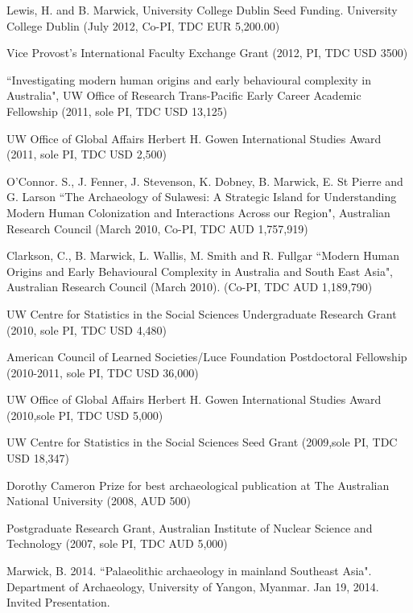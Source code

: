 \documentclass[11pt,article,oneside]{memoir}
\begin{document}
\ind Lewis, H. and B. Marwick,  University College Dublin Seed Funding. University College Dublin (July 2012, Co-PI, TDC EUR 5,200.00) 

\ind Vice Provost’s International Faculty Exchange Grant (2012, PI, TDC USD 3500)

\ind  ``Investigating modern human origins and early behavioural complexity in Australia", UW Office of Research Trans-Pacific Early Career Academic Fellowship (2011, sole PI, TDC USD 13,125)

\ind UW Office of Global Affairs Herbert H. Gowen International Studies Award (2011, sole PI, TDC USD 2,500)

\ind O’Connor. S., J. Fenner, J. Stevenson, K. Dobney, B. Marwick, E. St Pierre and G. Larson ``The Archaeology of Sulawesi: A Strategic Island for Understanding Modern Human Colonization and Interactions Across our Region", Australian Research Council (March 2010, Co-PI, TDC AUD 1,757,919)

\ind Clarkson, C., B. Marwick, L. Wallis, M. Smith and R. Fullgar  ``Modern Human Origins and Early Behavioural Complexity in Australia and South East Asia", Australian Research Council (March 2010). (Co-PI, TDC AUD 1,189,790)

\ind UW Centre for Statistics in the Social Sciences Undergraduate Research Grant (2010, sole PI, TDC USD 4,480)

\ind American Council  of Learned Societies/Luce Foundation Postdoctoral Fellowship (2010-2011, sole PI, TDC USD 36,000)

\ind UW Office of Global Affairs Herbert H. Gowen International Studies Award (2010,sole  PI, TDC USD 5,000)

\ind UW Centre for Statistics in the Social Sciences Seed Grant (2009,sole PI, TDC USD 18,347)

\ind Dorothy Cameron Prize for best archaeological publication at The Australian National University (2008, AUD 500)

\ind Postgraduate Research Grant, Australian Institute of Nuclear Science and Technology (2007, sole PI, TDC AUD 5,000)

\bigskip



\medskip

\ind Marwick, B. 2014. ``Palaeolithic archaeology in mainland Southeast Asia". Department of Archaeology, University of Yangon, Myanmar. Jan 19, 2014. Invited Presentation.
\end{document}
